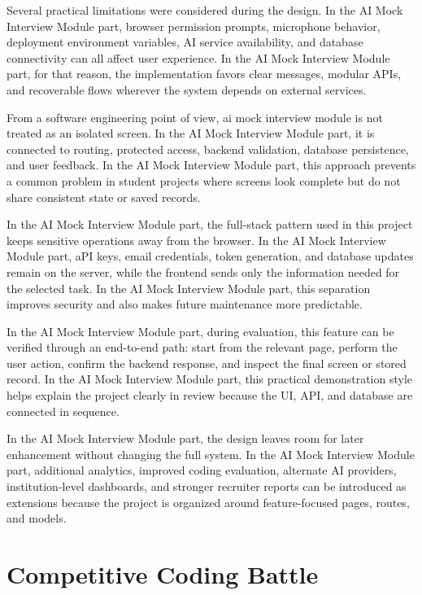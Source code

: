 \documentclass[12pt,a4paper]{report}
\begin{document}
Several practical limitations were considered during the design. In the AI Mock Interview Module part, browser permission prompts, microphone behavior, deployment environment variables, AI service availability, and database connectivity can all affect user experience. In the AI Mock Interview Module part, for that reason, the implementation favors clear messages, modular APIs, and recoverable flows wherever the system depends on external services.


From a software engineering point of view, ai mock interview module is not treated as an isolated screen. In the AI Mock Interview Module part, it is connected to routing, protected access, backend validation, database persistence, and user feedback. In the AI Mock Interview Module part, this approach prevents a common problem in student projects where screens look complete but do not share consistent state or saved records.


In the AI Mock Interview Module part, the full-stack pattern used in this project keeps sensitive operations away from the browser. In the AI Mock Interview Module part, aPI keys, email credentials, token generation, and database updates remain on the server, while the frontend sends only the information needed for the selected task. In the AI Mock Interview Module part, this separation improves security and also makes future maintenance more predictable.


In the AI Mock Interview Module part, during evaluation, this feature can be verified through an end-to-end path: start from the relevant page, perform the user action, confirm the backend response, and inspect the final screen or stored record. In the AI Mock Interview Module part, this practical demonstration style helps explain the project clearly in review because the UI, API, and database are connected in sequence.


In the AI Mock Interview Module part, the design leaves room for later enhancement without changing the full system. In the AI Mock Interview Module part, additional analytics, improved coding evaluation, alternate AI providers, institution-level dashboards, and stronger recruiter reports can be introduced as extensions because the project is organized around feature-focused pages, routes, and models.


\section{Competitive Coding Battle}
\end{document}
